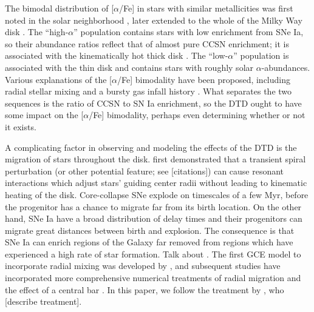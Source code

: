 \documentclass[twocolumn,twocolappendix,linenumbers,trackchanges]{aastex631}
\newcommand{\aFe}{[$\alpha$/Fe]\xspace}
\begin{document}
The bimodal distribution of \aFe in stars with similar metallicities was first noted in the solar neighborhood \citep[e.g.,][]{Furhmann1998-NearbyStars}, later extended to the whole of the Milky Way disk \citep{Nidever2014-ChemicalEvolutionAPOGEE,Hayden2015-ChemicalCartography}. The ``high-$\alpha$'' population contains stars with low enrichment from SNe Ia, so their abundance ratios reflect that of almost pure CCSN enrichment; it is associated with the kinematically hot thick disk \citep{Bensby2003-AbundanceTrends}. The ``low-$\alpha$'' population is associated with the thin disk and contains stars with roughly solar $\alpha$-abundances.
Various explanations of the \aFe bimodality have been proposed, including radial stellar mixing \citep{Schonrich2009-RadialMixing} and a bursty gas infall history \citep[e.g.,][]{Spitoni2021-TwoInfall}.
What separates the two sequences is the ratio of CCSN to SN Ia enrichment, so the DTD ought to have some impact on the \aFe bimodality, perhaps even determining whether or not it exists.

A complicating factor in observing and modeling the effects of the DTD is the migration of stars throughout the disk. \citet{SellwoodBinney2002-RadialMixing} first demonstrated that a transient spiral perturbation (or other potential feature; see [citations]) can cause resonant interactions which adjust stars' guiding center radii without leading to kinematic heating of the disk. Core-collapse SNe explode on timescales of a few Myr, before the progenitor has a chance to migrate far from its birth location. On the other hand, SNe Ia have a broad distribution of delay times and their progenitors can migrate great distances between birth and explosion. The consequence is that SNe Ia can enrich regions of the Galaxy far removed from regions which have experienced a high rate of star formation. Talk about \citet{Scannapieco2005-ChemicalEnrichment}. The first GCE model to incorporate radial mixing was developed by \citet{Schonrich2009-RadialMixing}, and subsequent studies have incorporated more comprehensive numerical treatments of radial migration and the effect of a central bar \citep[e.g.,][]{Minchev2013-ChemodynamicalEvolution}. In this paper, we follow the treatment by , who [describe treatment]. 
\end{document}
